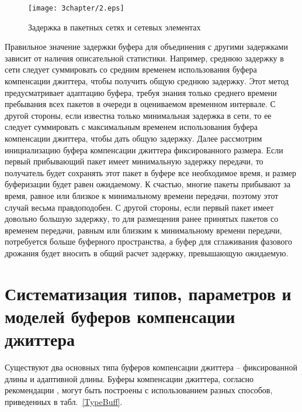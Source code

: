 \begin{figure} [h]
  \center
\texttt{[image: 3chapter/2.eps]}
  \caption{Задержка в пакетных сетях и сетевых элементах}
  \label{img3:delNode}
\end{figure}

Правильное значение задержки буфера для объединения с другими задержками зависит от наличия описательной статистики. Например, среднюю задержку в сети следует суммировать со средним временем использования буфера компенсации джиттера, чтобы получить общую среднюю задержку. Этот метод предусматривает адаптацию буфера, требуя знания только среднего времени пребывания всех пакетов в очереди в оцениваемом временном интервале. С другой стороны, если известна только минимальная задержка в сети, то ее следует суммировать с максимальным временем использования буфера компенсации джиттера, чтобы дать общую задержку.
Далее рассмотрим инициализацию буфера компенсации джиттера фиксированного размера. Если первый прибывающий пакет имеет минимальную задержку передачи, то получатель будет сохранять этот пакет в буфере все необходимое время, и размер буферизации будет равен ожидаемому. К счастью, многие пакеты прибывают за время, равное или близкое к минимальному времени передачи, поэтому этот случай весьма правдоподобен. 
С другой стороны, если первый пакет имеет довольно большую задержку, то для размещения ранее принятых пакетов со временем передачи, равным или близким к минимальному времени передачи, потребуется больше буферного пространства, а буфер для сглаживания фазового дрожания будет вносить в общий расчет задержку, превышающую ожидаемую.

\section{Систематизация типов, параметров и моделей буферов компенсации джиттера} \label{sect3_3}

Существуют два основных типа буферов компенсации джиттера – фиксированной длины и адаптивной длины. Буферы компенсации джиттера, согласно рекомендации \cite{G1020}, могут быть построены с использованием разных способов, приведенных в табл. \ref{TypeBuff}.


